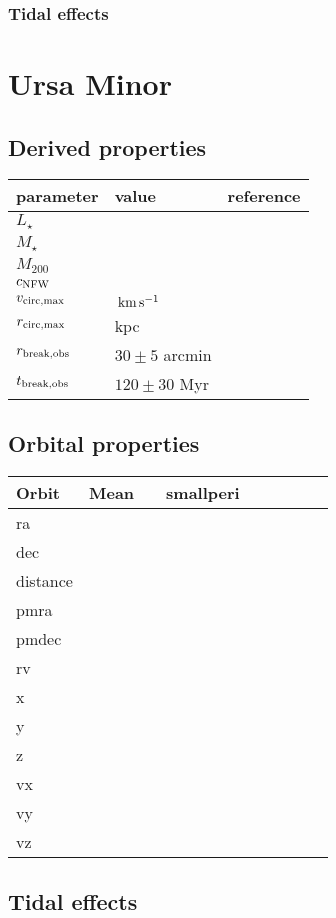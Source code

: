 \subsubsection{Tidal effects}\label{tidal-effects-1}

\section{Ursa Minor}\label{ursa-minor}

\subsection{Derived properties}\label{derived-properties-1}

\begin{table*}[t]
\centering
\begin{tabular}{lll}
\toprule
parameter & value & reference\\
\midrule
$L_\star$ &  & \\
$M_\star$ &  & \\
$M_{200}$ &  & \\
$c_{\rm NFW}$ &  & \\
$v_{\rm circ, max}$ & $\,{\rm km\,s^{-1}}$ & \\
$r_{\rm circ, max}$ & kpc & \\
$r_{\rm break, obs}$ & $30 \pm 5$ arcmin & \\
$t_{\rm break, obs}$ & $120\pm30$ Myr & \\
\bottomrule
\end{tabular}
\end{table*}

\subsection{Orbital properties}\label{orbital-properties-1}

\begin{table*}[t]
\centering
\begin{tabular}{lllllllll}
\toprule
Orbit & Mean &  & smallperi &  &  &  &  & \\
\midrule
ra &  &  &  &  &  &  &  & \\
dec &  &  &  &  &  &  &  & \\
distance &  &  &  &  &  &  &  & \\
pmra &  &  &  &  &  &  &  & \\
pmdec &  &  &  &  &  &  &  & \\
rv &  &  &  &  &  &  &  & \\
x &  &  &  &  &  &  &  & \\
y &  &  &  &  &  &  &  & \\
z &  &  &  &  &  &  &  & \\
vx &  &  &  &  &  &  &  & \\
vy &  &  &  &  &  &  &  & \\
vz &  &  &  &  &  &  &  & \\
\bottomrule
\end{tabular}
\end{table*}

\subsection{Tidal effects}\label{tidal-effects-2}
